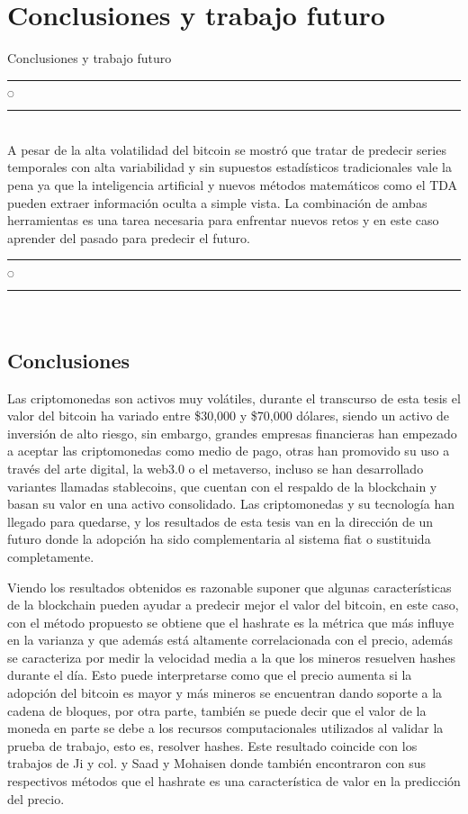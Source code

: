 \chapter[Conclusiones]{Conclusiones y trabajo futuro}{Conclusiones y trabajo futuro}\label{Conclusion}

\noindent
\rule{0.49\textwidth}{0.75pt} $_{\bigcirc}$ \rule{0.49\textwidth}{0.75pt}\\

A pesar de la alta volatilidad del bitcoin se mostró que tratar de predecir series temporales con alta variabilidad y sin supuestos estadísticos tradicionales vale la pena ya que la inteligencia artificial y nuevos métodos matemáticos como el TDA pueden extraer información oculta a simple vista. La combinación de ambas herramientas es una tarea necesaria para enfrentar nuevos retos y en este caso aprender del pasado para predecir el futuro.

\noindent
\rule{0.49\textwidth}{0.75pt} $_{\bigcirc}$ \rule{0.49\textwidth}{0.75pt}\\
\clearpage

\section{Conclusiones}


Las criptomonedas son activos muy volátiles, durante el transcurso de esta tesis el valor del bitcoin ha variado entre \$30,000 y \$70,000 dólares, siendo un activo de inversión de alto riesgo, sin embargo, grandes empresas financieras han empezado a aceptar las criptomonedas como medio de pago, otras han promovido su uso a través del arte digital, la web3.0 o el metaverso, incluso se han desarrollado variantes llamadas stablecoins, que cuentan con el respaldo de la blockchain y basan su valor en una activo consolidado. Las criptomonedas y su tecnología han llegado para quedarse, y los resultados de esta tesis van en la dirección de un futuro donde la adopción ha sido complementaria al sistema fiat o sustituida completamente.

Viendo los resultados obtenidos es razonable suponer que algunas características de la blockchain pueden ayudar a predecir mejor el valor del bitcoin, en este caso, con el método propuesto se obtiene que el hashrate es la métrica que más influye en la varianza y que además está altamente correlacionada con el precio, además se caracteriza por medir la velocidad media a la que los mineros resuelven hashes durante el día. Esto puede interpretarse como que el precio aumenta si la adopción del bitcoin es mayor y más mineros se encuentran dando soporte a la cadena de bloques, por otra parte, también se puede decir que el valor de la moneda en parte se debe a los recursos computacionales utilizados al validar la prueba de trabajo, esto es, resolver hashes. Este resultado coincide con los trabajos de Ji y col. \parencite*{jiBestFeatureSelection2019} y Saad y Mohaisen \parencite*{saadCharacterizingBlockchainbasedCryptocurrencies2018} donde también encontraron con sus respectivos métodos que el hashrate es una característica de valor en la predicción del precio. 

